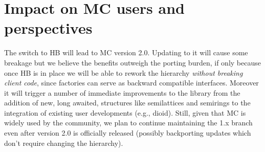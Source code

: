 \documentclass{easychair}
\def\MC{{\sf MC}}
\def\HB{{\sf HB}}
\begin{document}
\section{Impact on \MC{} users and perspectives}

The switch to \HB{} will lead to \MC{} version 2.0. Updating to it will cause some
breakage but we believe the benefits outweigh the porting burden, if only because
once \HB{} is in place we will be able to rework the hierarchy
\emph{without breaking client code}, since factories can serve as backward
compatible interfaces. Moreover it will trigger a number
of immediate improvements to the library from the addition of new, long awaited,
structures like semilattices and semirings to the integration of existing user
developments (e.g., dioid).
%
Still, given that \MC{} is widely used by the community, we plan to continue
maintaining the 1.x branch even after version 2.0 is officially released
(possibly backporting updates which don't require changing the hierarchy).

\label{sect:bib}

%
%
%


\end{document}
